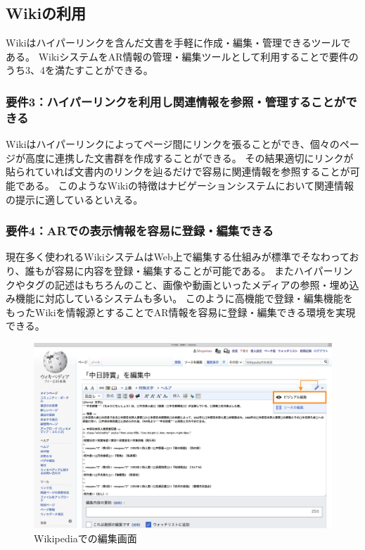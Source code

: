 \subsection{Wikiの利用}
Wikiはハイパーリンクを含んだ文書を手軽に作成・編集・管理できるツールである。
WikiシステムをAR情報の管理・編集ツールとして利用することで要件のうち3、4を満たすことができる。

\subsubsection*{要件3：ハイパーリンクを利用し関連情報を参照・管理することができる}
Wikiはハイパーリンクによってページ間にリンクを張ることができ、個々のページが高度に連携した文書群を作成することができる。
その結果適切にリンクが貼られていれば文書内のリンクを辿るだけで容易に関連情報を参照することが可能である。
このようなWikiの特徴はナビゲーションシステムにおいて関連情報の提示に適しているといえる。

\subsubsection*{要件4：ARでの表示情報を容易に登録・編集できる}
現在多く使われるWikiシステムはWeb上で編集する仕組みが標準でそなわっており、誰もが容易に内容を登録・編集することが可能である。
またハイパーリンクやタグの記述はもちろんのこと、画像や動画といったメディアの参照・埋め込み機能に対応しているシステムも多い。
このように高機能で登録・編集機能をもったWikiを情報源とすることでAR情報を容易に登録・編集できる環境を実現できる。

\begin{figure}[h]
  \centering
  \includegraphics[width=120mm]{images/wikipedia_edit.png}
  \caption{Wikipediaでの編集画面} \label{fig:wikipedia_edit}
\end{figure}

